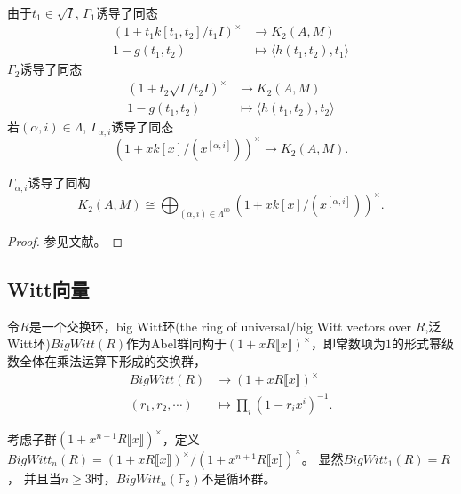 由于$t_1\in \sqrt{I}$, $\Gamma_1$诱导了同态
\begin{align*}
(1+t_1k[t_1,t_2]/t_1 I)^{\times} &\longrightarrow K_2(A,M)\\
1-g(t_1,t_2) & \mapsto \langle h(t_1,t_2),t_1 \rangle
\end{align*}
$\Gamma_2$诱导了同态
\begin{align*}
(1+t_2\sqrt{I}/t_2 I)^{\times} &\longrightarrow K_2(A,M)\\
1-g(t_1,t_2) & \mapsto \langle h(t_1,t_2),t_2 \rangle
\end{align*}
若$(\alpha,i)\in\Lambda$, $\Gamma_{\alpha,i}$诱导了同态
\[(1+xk[x]/(x^{[\alpha,i]}))^{\times} \longrightarrow K_2(A,M).\]
\begin{theorem}
\label{K2(A,M)}
	$\Gamma_{\alpha,i}$诱导了同构
\[ K_2(A,M)\cong \bigoplus_{(\alpha,i)\in\Lambda^{00}}(1+xk[x]/(x^{[\alpha,i]}))^{\times}.\]
\end{theorem}
\begin{proof}
	参见文献\cite{MR86f:18017}。
\end{proof}

\subsection{Witt向量}
令$R$是一个交换环，big Witt环(the ring of universal/big Witt vectors over $R$,泛Witt环)$BigWitt(R)$作为Abel群同构于$(1+xR\llbracket x\rrbracket )^{\times}$，即常数项为$1$的形式幂级数全体在乘法运算下形成的交换群，
\begin{align*}
BigWitt(R) &\longrightarrow (1+xR\llbracket x\rrbracket )^{\times}\\
(r_1,r_2,\cdots) & \mapsto \prod_i(1-r_i x^i)^{-1}.
\end{align*}



考虑子群$(1+x^{n+1}R\llbracket x\rrbracket )^{\times}$，定义$BigWitt_n(R)=(1+xR\llbracket x\rrbracket )^{\times}/(1+x^{n+1}R\llbracket x\rrbracket )^{\times}$。 显然$BigWitt_1(R)=R$， 并且当$n\geq 3$时，$BigWitt_n(\mathbb{F}_2)$不是循环群。


